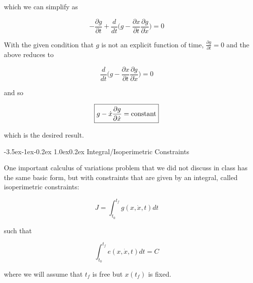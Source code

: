 \documentclass[11pt,letterpaper,onecolumn,notitlepage]{article}
\makeatletter
\renewcommand\section{\@startsection{section}{1}{\z@}%
{-3.5ex\@plus-1ex\@minus-0.2ex}%
{1.0ex\@plus0.2ex}%
{\fontsize{12pt}{12pt}\selectfont\bfseries\sffamily}}
\makeatother
\begin{document}
  which we can simplify as

  \begin{equation*}
    -\frac{\partial{}g}{\partial{}t}+\frac{d}{dt}\biggr(g-\frac{\partial{}x}{\partial{}t}\frac{\partial{}g}{\partial\dot{x}}\biggr)=0
  \end{equation*}

  With the given condition that $g$ is not an explicit function of time, $\frac{\partial{}g}{\partial{}t}=0$ and the above reduces to

  \begin{equation*}
    \frac{d}{dt}\biggr(g-\frac{\partial{}x}{\partial{}t}\frac{\partial{}g}{\partial\dot{x}}\biggr)=0
  \end{equation*}

  and so

  \begin{equation*}
    \boxed{%
      g-\dot{x}\frac{\partial{}g}{\partial\dot{x}}=\text{constant}
    }
  \end{equation*}

  which is the desired result.

  \clearpage
  \section{Integral/Isoperimetric Constraints}

  One important calculus of variations problem that we did not discuss in class has the same basic form, but with constraints that are given by an integral, called isoperimetric constraints:

  \begin{equation*}
    J=\int_{t_{0}}^{t_{f}}g(x,\dot{x},t)dt
  \end{equation*}

  such that

  \begin{equation*}
    \int_{t_{0}}^{t_{f}}e(x,\dot{x},t)dt=C
  \end{equation*}

  where we will assume that $t_{f}$ is free but $x(t_{f})$ is fixed.
\end{document}

